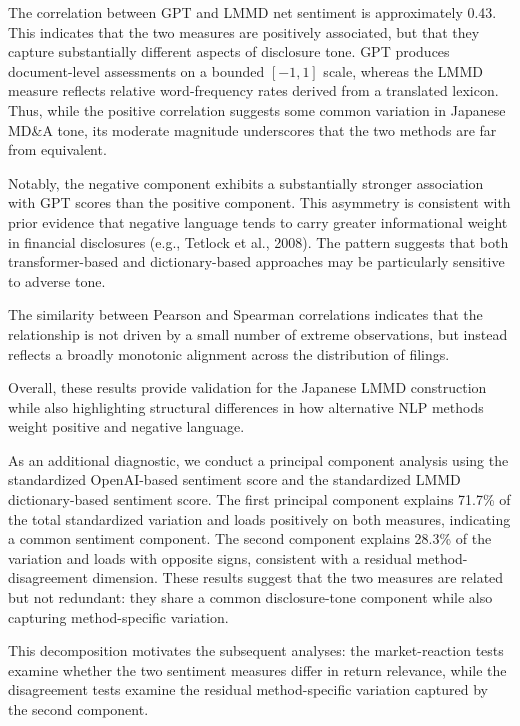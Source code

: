 The correlation between GPT and LMMD net sentiment is approximately 0.43. This indicates that the two measures are positively associated, but that they capture substantially different aspects of disclosure tone. GPT produces document-level assessments on a bounded $[-1,1]$ scale, whereas the LMMD measure reflects relative word-frequency rates derived from a translated lexicon. Thus, while the positive correlation suggests some common variation in Japanese MD\&A tone, its moderate magnitude underscores that the two methods are far from equivalent.

Notably, the negative component exhibits a substantially stronger association
with GPT scores than the positive component. This asymmetry is consistent
with prior evidence that negative language tends to carry greater informational
weight in financial disclosures (e.g., Tetlock et al., 2008). The pattern
suggests that both transformer-based and dictionary-based approaches may be
particularly sensitive to adverse tone.

The similarity between Pearson and Spearman correlations indicates that the
relationship is not driven by a small number of extreme observations, but
instead reflects a broadly monotonic alignment across the distribution of
filings.

Overall, these results provide validation for the Japanese LMMD
construction while also highlighting structural differences in how
alternative NLP methods weight positive and negative language.

As an additional diagnostic, we conduct a principal component analysis using the standardized OpenAI-based sentiment score and the standardized LMMD dictionary-based sentiment score. The first principal component explains 71.7\% of the total standardized variation and loads positively on both measures, indicating a common sentiment component. The second component explains 28.3\% of the variation and loads with opposite signs, consistent with a residual method-disagreement dimension. These results suggest that the two measures are related but not redundant: they share a common disclosure-tone component while also capturing method-specific variation.



This decomposition motivates the subsequent analyses: the market-reaction tests examine whether the two sentiment measures differ in return relevance, while the disagreement tests examine the residual method-specific variation captured by the second component.


